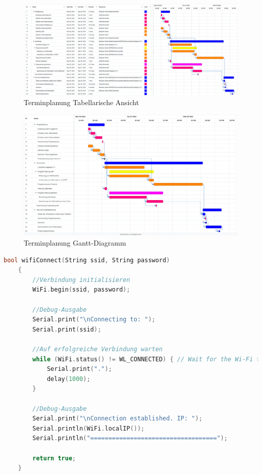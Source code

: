 \begin{figure} [H]
	\centering
	\includegraphics[width=15cm]{images/Zeitplanung.png}
	\caption[Terminplanung Tabellarisch]{Terminplanung Tabellarische Ansicht}
	\label{fig:terminplanung_tabellarisch}
\end{figure}

\begin{figure} [H]
	\centering
	\includegraphics[width=15cm]{images/Gantt.png}
	\caption[Terminplanung Gantt]{Terminplanung Gantt-Diagramm}
	\label{fig:terminplanung_gantt}
\end{figure}

\begin{lstlisting}[language=C++,caption={WiFi connect}, label=lst:wificonnect]
	bool wifiConnect(String ssid, String password)
	{
		//Verbindung initialisieren
		WiFi.begin(ssid, password);
		
		//Debug-Ausgabe
		Serial.print("\nConnecting to: ");
		Serial.print(ssid);
		
		//Auf erfolgreiche Verbindung warten
		while (WiFi.status() != WL_CONNECTED) { // Wait for the Wi-Fi to connect
			Serial.print(".");
			delay(1000);
		}
		
		//Debug-Ausgabe
		Serial.print("\nConnection established. IP: ");
		Serial.println(WiFi.localIP());
		Serial.println("===================================");
		
		return true;
	}
\end{lstlisting}


